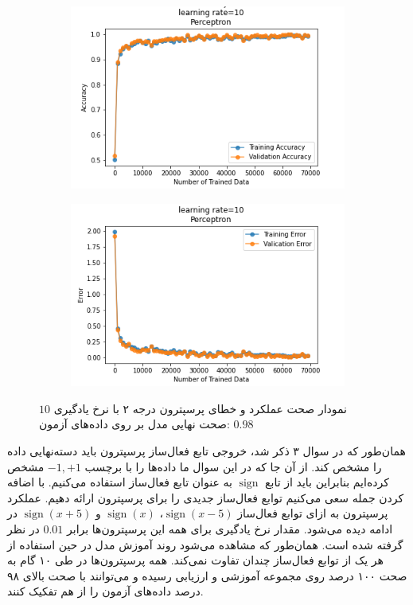 \documentclass[12pt, a4paper]{article}
\DeclareMathOperator{\sign}{sign}
\begin{document}
\begin{figure}[h]
    \begin{subfigure}{0.45\linewidth}
        \centering
        \includegraphics[width=\linewidth]{images/6/perceptron/lr/acc_10.png}
    \end{subfigure}
    \hfil
    \begin{subfigure}{0.45\linewidth}
        \centering
        \includegraphics[width=\linewidth]{images/6/perceptron/lr/error_10.png}
    \end{subfigure}
    \caption{نمودار صحت عملکرد‌ و خطای پرسپترون درجه ۲ با نرخ یادگیری $10$
    \newline
    صحت نهایی مدل بر روی داده‌های آزمون: $0.98$}
\end{figure}

همان‌طور که در سوال ۳ ذکر شد، خروجی تابع فعال‌ساز پرسپترون باید دسته‌نهایی داده را مشخص کند.
از آن جا که در این سوال ما داده‌ها را با برچسب ${-1, +1}$ مشخص کرده‌ایم بنابراین باید از تابع $\sign$
به عنوان تابع فعال‌ساز استفاده می‌کنیم. با اضافه کردن جمله  سعی می‌کنیم توابع فعال‌ساز
جدیدی را برای پرسپترون ارائه دهیم. عملکرد پرسپترون به ازای توابع فعال‌ساز $\sign(x-5)$، $\sign(x)$ و
$\sign(x+5)$ در ادامه دیده می‌شود. مقدار نرخ یادگیری برای همه این پرسپترون‌ها برابر $0.01$ در نظر گرفته
شده است. همان‌طور که مشاهده می‌شود روند آموزش مدل در حین استفاده از هر یک از توابع فعال‌ساز چندان
تفاوت نمی‌کند. همه پرسپترون‌ها در طی ۱۰ گام به صحت ۱۰۰ درصد روی مجموعه آموزشی و ارزیابی رسیده و می‌توانند
با صحت بالای ۹۸ درصد داده‌های آزمون را از هم تفکیک کنند.
\end{document}

